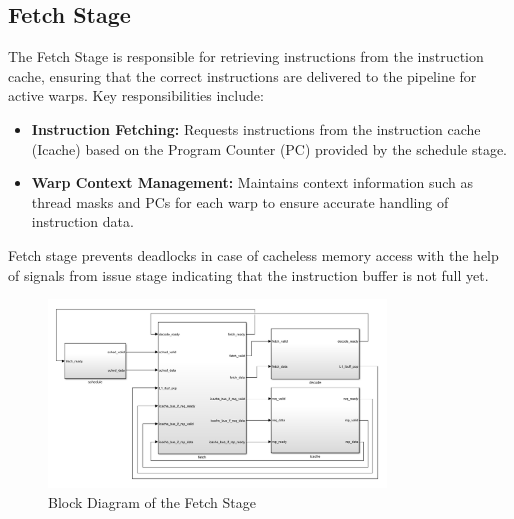 \documentclass[12pt]{report}
\begin{document}
\subsection{Fetch Stage}
The Fetch Stage is responsible for retrieving instructions from the instruction cache, ensuring that the correct instructions are delivered to the pipeline for active warps.  Key responsibilities include:
\begin{itemize}
    \item \textbf{Instruction Fetching:} Requests instructions from the instruction cache (Icache) based on the Program Counter (PC) provided by the schedule stage.
    \item \textbf{Warp Context Management:} Maintains context information such as thread masks and PCs for each warp to ensure accurate handling of instruction data.
\end{itemize}
Fetch stage prevents deadlocks in case of cacheless memory access with the help of signals from issue stage indicating that the instruction buffer is not full yet.
\begin{figure}[H]
    \centering
    \includegraphics[width=0.8\textwidth]{./figures/fetch.png}
    \caption{Block Diagram of the Fetch Stage}
\end{figure}
\end{document}
